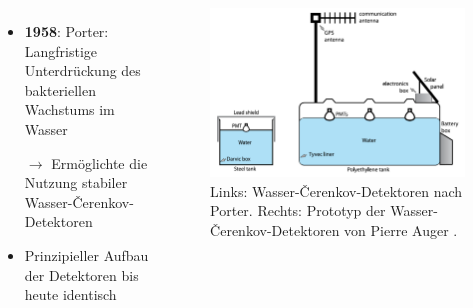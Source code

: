 \documentclass[aspectratio=1610, professionalfonts, 9pt, hyperref={colorlinks=false}]{beamer}
\begin{document}
\begin{frame}{}
  \begin{columns}
      \begin{itemize}
        \setlength\itemsep{0.5em}
        \item \textbf{1958}: Porter: Langfristige Unterdrückung des bakteriellen Wachstums im Wasser
        \item[$\rightarrow$] Ermöglichte die Nutzung stabiler Wasser-Čerenkov-Detektoren
        \item Prinzipieller Aufbau der Detektoren bis heute identisch
      \end{itemize}
        \vspace*{10px}
  
      \begin{figure}
          \centering
          \includegraphics[width=\linewidth]{images/cherenkov}
          \caption{Links: Wasser-Čerenkov-Detektoren nach Porter. Rechts: Prototyp der Wasser-Čerenkov-Detektoren von Pierre Auger \cite{9789400754225}.}
      \end{figure}
  \end{columns}
\end{frame}
\end{document}
